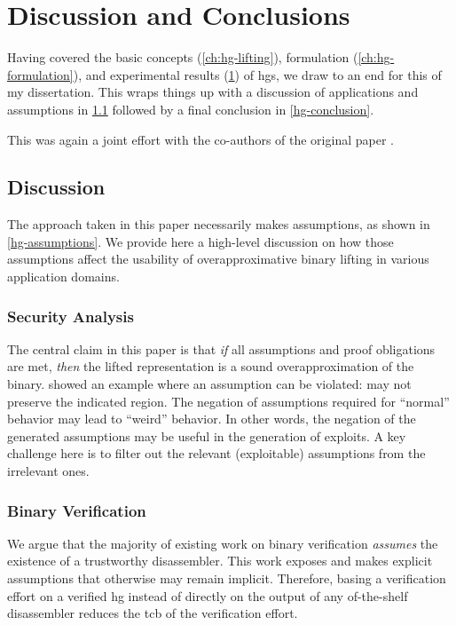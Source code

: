 \chapter{Discussion and Conclusions}\label{ch:hg-discussion}
Having covered the basic concepts (\cref{ch:hg-lifting}), formulation (\cref{ch:hg-formulation}), and experimental results (\cref{ch:hg-discussion}) of \acp{hg}, we draw to an end for this   of my dissertation.
This  wraps things up with a discussion of applications and assumptions in \cref{hg-discussion} followed by a final conclusion in \cref{hg-conclusion}.

This  was again a joint effort with the co-authors of the original paper \autocite{verbeek2022lifting}.

\section{Discussion}\label{hg-discussion}
The approach taken in this paper necessarily makes assumptions, as shown in \cref{hg-assumptions}.
We provide here a high-level discussion on how those assumptions affect the usability of overapproximative binary lifting in various application domains.

\subsection{Security Analysis}
The central claim in this paper is that \emph{if} all assumptions and proof obligations are met,
\emph{then} the lifted representation is a sound overapproximation of the binary.
 showed an example where an assumption can be violated:  may not preserve the indicated region.
The negation of assumptions required for ``normal'' behavior may lead to ``weird'' behavior.
In other words, the negation of the generated assumptions may be useful in the generation of exploits.
A key challenge here is to filter out the relevant (exploitable) assumptions from the irrelevant ones.

\subsection{Binary Verification}
We argue that the majority of existing work on binary verification \emph{assumes} the existence of a trustworthy disassembler.
This work exposes and makes explicit assumptions that otherwise may remain implicit.
Therefore, basing a verification effort on a verified \ac{hg} instead of directly on the output of any of-the-shelf disassembler reduces the \ac{tcb} of the verification effort.

